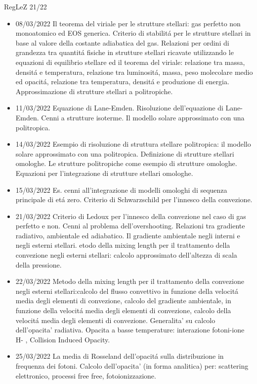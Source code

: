 \begin{frame}[allowframebreaks]{RegLeZ 21/22}
\begin{itemize}
\item 08/03/2022 Il teorema del viriale per le strutture stellari: gas perfetto non monoatomico ed EOS generica. Criterio di stabilit\'a per le strutture stellari in base al valore della costante adiabatica del gas. Relazioni per ordini di grandezza tra quantit\'a fisiche in strutture stellari ricavate utilizzando le equazioni di equilibrio stellare ed il teorema del viriale: relazione tra massa, densit\'a e temperatura, relazione tra luminosit\'a, massa, peso molecolare medio ed opacit\'a, relazione tra temperatura, densit\'a e produzione di energia. Approssimazione di strutture stellari a politropiche.
\item 11/03/2022 Equazione di Lane-Emden. Risoluzione dell'equazione di Lane-Emden. Cenni a strutture isoterme. Il modello solare approssimato con una politropica.
\item 14/03/2022 Esempio di risoluzione di struttura stellare politropica: il modello solare approssimato con una politropica. Definizione di strutture stellari omologhe. Le strutture politropiche come esempio di strutture omologhe. Equazioni per l'integrazione di strutture stellari omologhe.
\item 15/03/2022 Es. cenni all'integrazione di modelli omologhi di sequenza principale di et\'a zero. Criterio di Schwarzschild per l'innesco della convezione.
\item 21/03/2022 Criterio di Ledoux per l'innesco della convezione nel caso di gas perfetto e non. Cenni al problema dell'overshooting. Relazioni tra gradiente radiativo, ambientale ed adiabatico. Il gradiente ambientale negli interni e negli esterni stellari. etodo della mixing length per il trattamento della convezione negli esterni stellari: calcolo approssimato dell'altezza di scala della pressione.
\item 22/03/2022 Metodo della mixing length per il trattamento della convezione negli esterni stellari:calcolo del flusso convettivo in funzione della velocit\'a media degli elementi di convezione, calcolo del gradiente ambientale, in funzione della velocit\'a media degli elementi di convezione, calcolo della velocit\'a media degli elementi di convezione. Generalita' su calcolo dell'opacita' radiativa. Opacita a basse temperature: interazione fotoni-ione H- , Collision Induced Opacity.
\item 25/03/2022 La media di Rosseland dell'opacit\'a sulla distribuzione in frequenza dei fotoni. Calcolo dell'opacita' (in forma analitica) per: scattering elettronico, processi free free, fotoionizzazione.

\end{itemize}
\end{frame}

